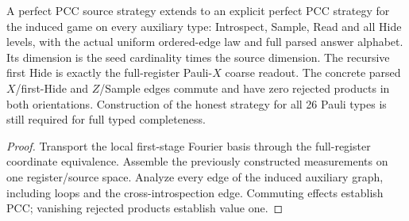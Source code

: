 \begin{lemma}
\label{lem:intro-honest-full-auxiliary}
\leanok
A perfect PCC source strategy extends to an explicit perfect PCC strategy
for the induced game on every auxiliary type: Introspect, Sample, Read and
all Hide levels, with the actual uniform ordered-edge law and full parsed
answer alphabet. Its dimension is the seed cardinality times the source
dimension. The recursive first Hide is exactly the full-register Pauli-$X$
coarse readout. The concrete parsed $X$/first-Hide and $Z$/Sample edges commute
and have zero rejected products in both orientations. Construction of the
honest strategy for all 26 Pauli types is still required for full typed
completeness.
\end{lemma}
\begin{proof}
\leanok
Transport the local first-stage Fourier basis through the full-register
coordinate equivalence. Assemble the previously constructed measurements
on one register/source space. Analyze every edge of the induced auxiliary
graph, including loops and the cross-introspection edge. Commuting effects
establish PCC; vanishing rejected products establish value one.
\end{proof}

